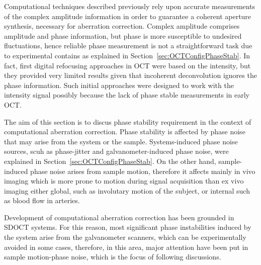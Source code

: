 Computational techniques described previously rely upon accurate measurements of the complex amplitude information in order to guarantee a coherent aperture synthesis, necessary for aberration correction. Complex amplitude comprises amplitude and phase information, but phase is more susceptible to undesired fluctuations, hence reliable phase measurement is not a straightforward task due to experimental contains as explained in Section~\ref{sec:OCTConfigPhaseStab}. In fact, first digital refocusing approaches in OCT were based on the intensity, but they provided very limited results given that incoherent deconvolution ignores the phase information. Such initial approaches were designed to work with the intensity signal possibly because the lack of phase stable measurements in early OCT.

The aim of this section is to discus phase stability requirement in the context of computational aberration correction. Phase stability is affected by phase noise that may arise from the system or the sample. Systems-induced phase noise sources, scuh as phase-jitter and galvanometer-induced phase noise, were explained in Section~\ref{sec:OCTConfigPhaseStab}. On the other hand, sample-induced phase noise arises from sample motion, therefore it affects mainly in vivo imaging which is more prone to motion during signal acquisition than ex vivo imaging either global, such as involutary motion of the subject, or internal such as blood flow in arteries.

Development of computational aberration correction has been grounded in SDOCT systems. For this reason, most significant phase instabilities induced by the system arise from the galvanometer scanners, which can be experimentally avoided in some cases, therefore, in this area, major attention have been put in sample motion-phase noise, which is the focus of following discussions.


